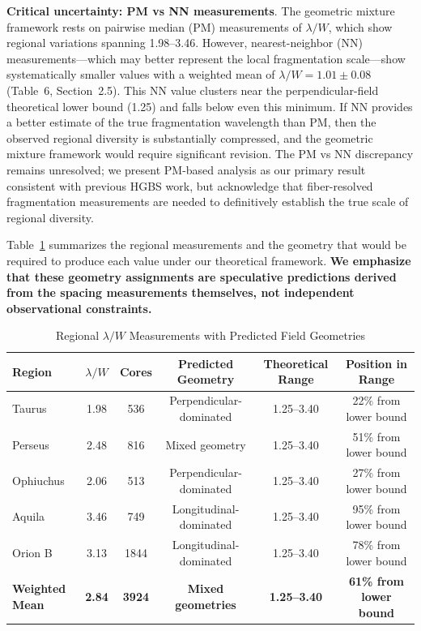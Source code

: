 \documentclass[twoside,twocolumn]{mnras}
\begin{document}
\textbf{Critical uncertainty: PM vs NN measurements}. The geometric mixture framework rests on pairwise median (PM) measurements of $\lambda/W$, which show regional variations spanning 1.98--3.46. However, nearest-neighbor (NN) measurements---which may better represent the local fragmentation scale---show systematically smaller values with a weighted mean of $\lambda/W = 1.01 \pm 0.08$ (Table~6, Section~2.5). This NN value clusters near the perpendicular-field theoretical lower bound (1.25) and falls below even this minimum. If NN provides a better estimate of the true fragmentation wavelength than PM, then the observed regional diversity is substantially compressed, and the geometric mixture framework would require significant revision. The PM vs NN discrepancy remains unresolved; we present PM-based analysis as our primary result consistent with previous HGBS work, but acknowledge that fiber-resolved fragmentation measurements are needed to definitively establish the true scale of regional diversity.

Table~\ref{tab:regional_validation} summarizes the regional measurements and the geometry that would be required to produce each value under our theoretical framework. \textbf{We emphasize that these geometry assignments are speculative predictions derived from the spacing measurements themselves, not independent observational constraints.}

\begin{table}
\caption{Regional $\lambda/W$ Measurements with Predicted Field Geometries}
\label{tab:regional_validation}
\begin{tabular}{lccccc}
\toprule
Region & $\lambda/W$ & Cores & \textbf{Predicted} Geometry & Theoretical Range & Position in Range \\
\midrule
Taurus & 1.98 & 536 & Perpendicular-dominated & 1.25--3.40 & 22\% from lower bound \\
Perseus & 2.48 & 816 & Mixed geometry & 1.25--3.40 & 51\% from lower bound \\
Ophiuchus & 2.06 & 513 & Perpendicular-dominated & 1.25--3.40 & 27\% from lower bound \\
Aquila & 3.46 & 749 & Longitudinal-dominated & 1.25--3.40 & 95\% from lower bound \\
Orion B & 3.13 & 1844 & Longitudinal-dominated & 1.25--3.40 & 78\% from lower bound \\
\midrule
\textbf{Weighted Mean} & \textbf{2.84} & \textbf{3924} & \textbf{Mixed geometries} & \textbf{1.25--3.40} & \textbf{61\% from lower bound} \\
\bottomrule
\end{tabular}
\end{table}
\end{document}
